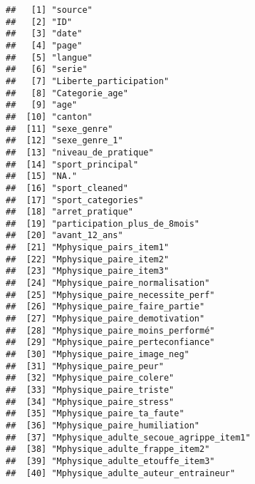 \documentclass[
]{article}
\begin{document}
\begin{verbatim}
##   [1] "source"                                              
##   [2] "ID"                                                  
##   [3] "date"                                                
##   [4] "page"                                                
##   [5] "langue"                                              
##   [6] "serie"                                               
##   [7] "Liberte_participation"                               
##   [8] "Categorie_age"                                       
##   [9] "age"                                                 
##  [10] "canton"                                              
##  [11] "sexe_genre"                                          
##  [12] "sexe_genre_1"                                        
##  [13] "niveau_de_pratique"                                  
##  [14] "sport_principal"                                     
##  [15] "NA."                                                 
##  [16] "sport_cleaned"                                       
##  [17] "sport_categories"                                    
##  [18] "arret_pratique"                                      
##  [19] "participation_plus_de_8mois"                         
##  [20] "avant_12_ans"                                        
##  [21] "Mphysique_pairs_item1"                               
##  [22] "Mphysique_paire_item2"                               
##  [23] "Mphysique_paire_item3"                               
##  [24] "Mphysique_paire_normalisation"                       
##  [25] "Mphysique_paire_necessite_perf"                      
##  [26] "Mphysique_paire_faire_partie"                        
##  [27] "Mphysique_paire_demotivation"                        
##  [28] "Mphysique_paire_moins_performé"                      
##  [29] "Mphysique_paire_perteconfiance"                      
##  [30] "Mphysique_paire_image_neg"                           
##  [31] "Mphysique_paire_peur"                                
##  [32] "Mphysique_paire_colere"                              
##  [33] "Mphysique_paire_triste"                              
##  [34] "Mphysique_paire_stress"                              
##  [35] "Mphysique_paire_ta_faute"                            
##  [36] "Mphysique_paire_humiliation"                         
##  [37] "Mphysique_adulte_secoue_agrippe_item1"               
##  [38] "Mphysique_adulte_frappe_item2"                       
##  [39] "Mphysique_adulte_etouffe_item3"                      
##  [40] "Mphysique_adulte_auteur_entraineur"                  

\end{verbatim}
\end{document}
